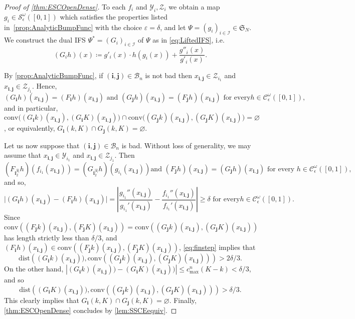 \documentclass[11pt,]{article}
\def\cref#1{\ref{#1}}%
\theoremstyle{definition}
\theoremstyle{remark}
\newcommand{\0}{\mathbf{0}}
\newcommand{\bi}{\mathbf{i}}
\newcommand{\bj}{\mathbf{j}}
\begin{document}
\begin{proof}[Proof of \cref{thm:ESCOpenDense}]
To each $f_i$ and $\mathcal{Y}_i, \mathcal{Z}_i$ we obtain a map
$g_i\in\mathcal{S}_\epsilon^\omega([0,1])$ which satisfies the properties
listed in~\cref{prop:AnalyticBumpFunc} with the choice $\varepsilon=\delta$, and let
$\Psi=(g_i)_{i\in\mathcal{I}}\in\mathfrak{S}_N$. We construct the dual IFS
$\Psi^*=(G_i)_{i\in\mathcal{I}}$ of $\Psi$ as in \cref{eq:LiftedIFS}, i.e. 
\begin{equation*}
(G_ih)(x)\coloneqq g'_i(x)\cdot h(g_i(x)) + \frac{g''_i(x)}{g'_i(x)}.
\end{equation*}

By \cref{prop:AnalyticBumpFunc}, if $(\bi,\bj)\in\mathcal{B}_n$ is not bad then
$x_{\bi,\bj}\in\mathcal{Z}_{i_1}$ and $x_{\bi,\bj}\in\mathcal{Z}_{j_1}$. Hence,
\begin{equation*}
(G_{\bi}h)(x_{\bi,\bj})=(F_{\bi}h)(x_{\bi,\bj}) \text{ and }
(G_{\bj}h)(x_{\bi,\bj})=(F_{\bj}h)(x_{\bi,\bj})\text{ for every
}h\in\mathcal{C}_\epsilon^\omega([0,1]),
\end{equation*}
and in particular, $\mathrm{conv}\big((G_{\bi}k)(x_{\bi,\bj}), (G_{\bi}K)(x_{\bi,\bj})\big) \cap
\mathrm{conv}\big((G_{\bj}k)(x_{\bi,\bj}),
(G_{\bj}K)(x_{\bi,\bj})\big)=\varnothing$, or equivalently, $G_{\bi}(k,K)\cap G_{\bj}(k,K)=\varnothing$.

Let us now suppose that $(\bi,\bj)\in\mathcal{B}_n$ is bad. Without loss of generality, we may
assume that $x_{\bi,\bj}\in\mathcal{Y}_{i_1}$ and $x_{\bi,\bj}\in\mathcal{Z}_{j_1}$. Then
\begin{equation*}
	(F_{\bi_2^{|\bi|}}h)(f_{i_1}(x_{\bi,\bj}))=(G_{\bi_2^{|\bi|}}h)(g_{i_1}(x_{\bi,\bj})) \text{
	and } (F_{\bj}h)(x_{\bi,\bj})=(G_{\bj}h)(x_{\bi,\bj})\text{ for every
	}h\in\mathcal{C}_\epsilon^\omega([0,1]),
\end{equation*}
and so,
\begin{equation}\label{eq:finstep}
\big|(G_{\bi}h)(x_{\bi,\bj})-(F_{\bi}h)(x_{\bi,\bj})\big| = \left|
\frac{g_{i_1}''(x_{\bi,\bj})}{g_{i_1}'(x_{\bi,\bj})} -
\frac{f_{i_1}''(x_{\bi,\bj})}{f_{i_1}'(x_{\bi,\bj})} \right|\geq \delta\text{ for every
}h\in\mathcal{C}_\epsilon^\omega([0,1]).
\end{equation}
Since
$\mathrm{conv}\left((F_{\bj}k)(x_{\bi,\bj}),(F_{\bj}K)(x_{\bi,\bj})\right)=\mathrm{conv}\left((G_{\bj}k)(x_{\bi,\bj}),(G_{\bj}K)(x_{\bi,\bj})\right)$
has length strictly less than $\delta/3$, and
$(F_{\bi}h)(x_{\bi,\bj})\in\mathrm{conv}\left((F_{\bj}k)(x_{\bi,\bj}),(F_{\bj}K)(x_{\bi,\bj})\right)$,
\cref{eq:finstep} implies that 
$$
\mathrm{dist}\left((G_{\bi}k)(x_{\bi,\bj})),\mathrm{conv}\left((G_{\bj}k)(x_{\bi,\bj}),(G_{\bj}K)(x_{\bi,\bj})\right)\right)>2\delta/3. 
$$
On the other hand, $|(G_{\bi}k)(x_{\bi,\bj}))-(G_{\bi}K)(x_{\bi,\bj}))|\leq c_{\max}^n(K-k)<\delta/3$, and so 
$$
\mathrm{dist}\left((G_{\bi}K)(x_{\bi,\bj})),\mathrm{conv}\left((G_{\bj}k)(x_{\bi,\bj}),(G_{\bj}K)(x_{\bi,\bj})\right)\right)>\delta/3. 
$$
This clearly implies that  $G_{\bi}(k,K)\cap G_{\bj}(k,K)=\varnothing$. Finally, \cref{thm:ESCOpenDense} concludes by \cref{lem:SSCEequiv}.   
\end{proof}
\end{document}
